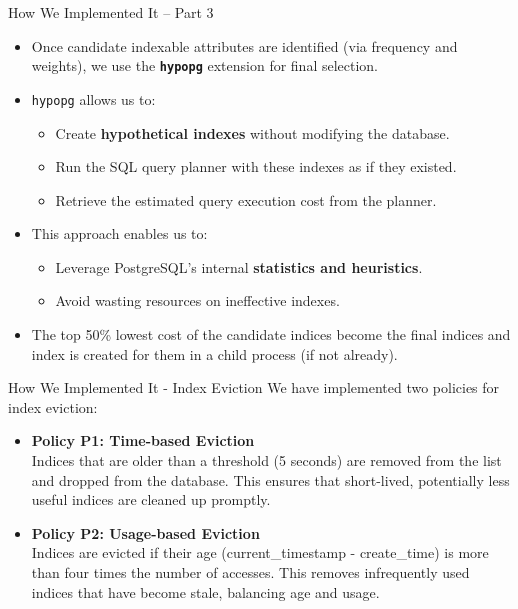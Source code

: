 \documentclass[Serif, 10pt, brown]{beamer}
\theoremstyle{example}
\theoremstyle{plain}
\begin{document}
\begin{frame}{How We Implemented It – Part 3}
	\begin{itemize}
		\item Once candidate indexable attributes are identified (via frequency and weights), we use the \textbf{\texttt{hypopg}} extension for final selection.
		
		\item \texttt{hypopg} allows us to:
		\begin{itemize}
			\item Create \textbf{hypothetical indexes} without modifying the database.
			\item Run the SQL query planner with these indexes as if they existed.
			\item Retrieve the estimated query execution cost from the planner.
		\end{itemize}
	
		\item This approach enables us to:
		\begin{itemize}
			\item Leverage PostgreSQL’s internal \textbf{statistics and heuristics}.
			\item Avoid wasting resources on ineffective indexes.
		\end{itemize}
	
		\item The top 50\% lowest cost of the candidate indices become the final indices and index is created for them in a child process (if not already).
	\end{itemize}
\end{frame}

	

\begin{frame}{How We Implemented It - Index Eviction}
    We have implemented two policies for index eviction:
    \begin{itemize}
        \item \textbf{Policy P1: Time-based Eviction} \\
        Indices that are older than a threshold (5 seconds) are removed from the list and dropped from the database. This ensures that short-lived, potentially less useful indices are cleaned up promptly.

        \item \textbf{Policy P2: Usage-based Eviction} \\
        Indices are evicted if their age (current\_timestamp - create\_time) is more than four times the number of accesses. This removes infrequently used indices that have become stale, balancing age and usage.
    \end{itemize}
\end{frame}
\end{document}
